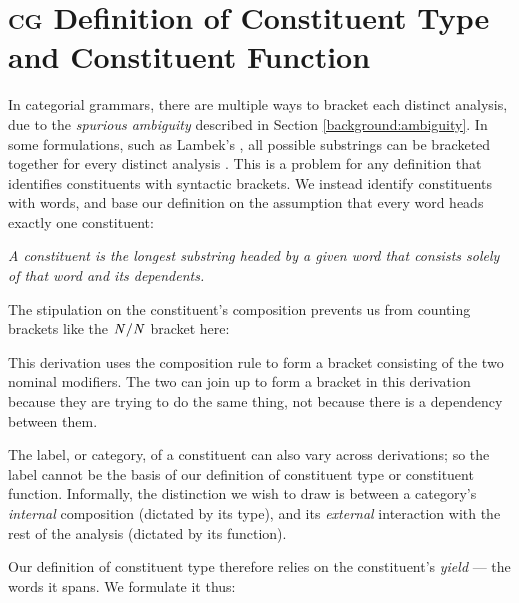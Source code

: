 \documentclass[11pt,twoside,final]{ahudson-harvard}
\newcommand{\cf}[1]{\mbox{$\it{#1}$}}   %
\newcommand{\cg}{\textsc{cg}\xspace}
\newcommand{\definition}[1]{\emph{#1}}
\begin{document}
\section{\cg Definition of Constituent Type and Constituent Function}

In categorial grammars, there are multiple ways to bracket each distinct analysis, due to the \emph{spurious ambiguity} described in Section \ref{background:ambiguity}. In some formulations, such as Lambek's \citeyear{lambek}, all possible substrings can be bracketed together for every distinct analysis \citep{wood:93}. This is a problem for any definition that identifies constituents with syntactic brackets. We instead identify constituents with words, and base our definition on the assumption that every word heads exactly one constituent:

\definition{A constituent is the longest substring headed by a given word that consists solely of that word and its dependents.}

The stipulation on the constituent's composition prevents us from counting brackets like the \cf{N/N} bracket here:

\begin{center}
\deriv{3}{
\rm water & \rm meter & \rm cover \\
\uline{1}&\uline{1}&\uline{1} \\
\cf{N/N} &
\cf{N/N} &
\cf{N} \\
\fcomp{2} \\
\mc{2}{\cf{N/N}} \\
& \fapply{2} \\
& \mc{2}{\cf{N}}
}
\end{center}
This derivation uses the composition rule to form a bracket consisting of the two nominal modifiers. The two can join up to form a bracket in this derivation because they are trying to do the same thing, not because there is a dependency between them.

The label, or category, of a constituent can also vary across derivations; so the label cannot be the basis of our definition of constituent type or constituent function. Informally, the distinction we wish to draw is between a category's \emph{internal} composition (dictated by its type), and its \emph{external} interaction with the rest of the analysis (dictated by its function).

Our definition of constituent type therefore relies on the constituent's \emph{yield} --- the words it spans. We formulate it thus:
\end{document}
